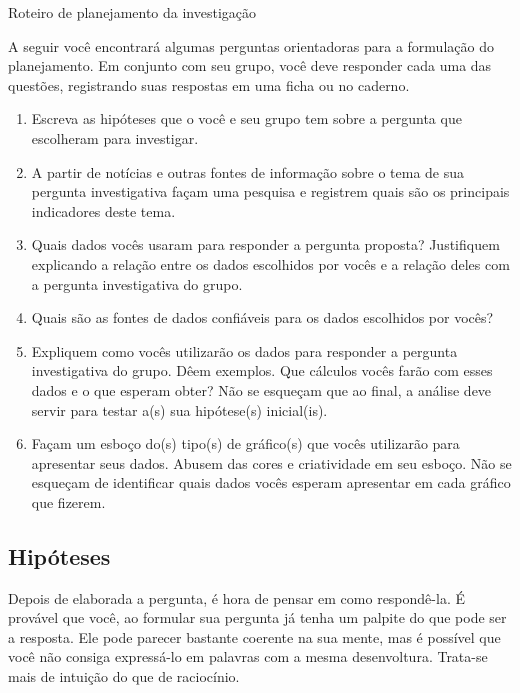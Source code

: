 \begin{task}{Roteiro de planejamento da investigação}

A seguir você encontrará algumas perguntas orientadoras para a formulação do planejamento. Em conjunto com seu grupo, você deve responder cada uma das questões, registrando suas respostas em uma ficha ou no caderno. 

\begin{enumerate}[label=\titem{\arabic*)}]
\item Escreva as hipóteses que o você e seu grupo tem sobre a pergunta que escolheram para investigar.

\item A partir de notícias e outras fontes de informação sobre o tema de sua pergunta investigativa façam uma pesquisa e registrem quais são os principais indicadores deste tema.

\item Quais dados vocês usaram para responder a pergunta proposta? Justifiquem explicando a relação entre os dados escolhidos por vocês e a relação deles com a pergunta investigativa do grupo.

\item Quais são as fontes de dados confiáveis para os dados escolhidos por vocês?

\item Expliquem como vocês utilizarão os dados para responder a pergunta investigativa do grupo. Dêem exemplos. Que cálculos vocês farão com esses dados e o que esperam obter? Não se esqueçam que ao final, a análise deve servir para testar a(s) sua hipótese(s) inicial(is).

\item Façam um esboço do(s) tipo(s) de gráfico(s) que vocês utilizarão para apresentar seus dados. Abusem das cores e criatividade em seu esboço. Não se esqueçam de identificar quais dados vocês esperam apresentar em cada gráfico que fizerem. 
\end{enumerate}
\end{task}

\subsection{Hipóteses}

Depois de elaborada a pergunta, é hora de pensar em como respondê-la. É provável que você, ao formular sua pergunta já tenha um palpite do que pode ser a resposta. Ele pode parecer bastante coerente na sua mente, mas é possível que você não consiga expressá-lo em palavras com a mesma desenvoltura. Trata-se mais de intuição do que de raciocínio.

